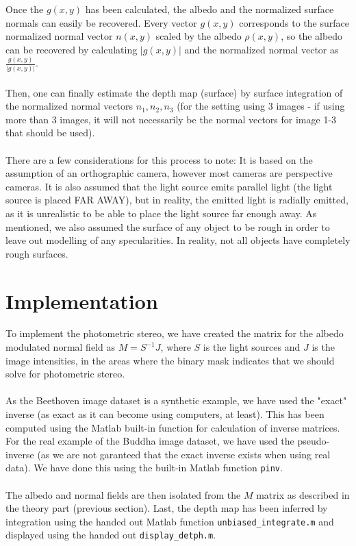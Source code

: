 \documentclass[12pt,a4paper,oneside,final]{article}
\begin{document}
Once the $g(x,y)$ has been calculated, the albedo and the normalized surface normals can easily be recovered. Every vector $g(x,y)$ corresponds to the surface normalized normal vector $n(x,y)$ scaled by the albedo $\rho(x,y)$, so the albedo can be recovered by calculating $|g(x,y)|$ and the normalized normal vector as $\frac{g(x,y)}{|g(x,y)|}$.\\\\
Then, one can finally estimate the depth map (surface) by surface integration of the normalized normal vectors $n_1, n_2, n_3$ (for the setting using 3 images - if using more than 3 images, it will not necessarily be the normal vectors for image 1-3 that should be used).\\\\
There are a few considerations for this process to note: It is based on the assumption of an orthographic camera, however most cameras are perspective cameras. It is also assumed that the light source emits parallel light (the light source is placed FAR AWAY), but in reality, the emitted light is radially emitted, as it is unrealistic to be able to place the light source far enough away. As mentioned, we also assumed the surface of any object to be rough in order to leave out modelling of any specularities. In reality, not all objects have completely rough surfaces.

\section{Implementation}

To implement the photometric stereo, we have created the matrix for the albedo modulated normal field as $M = S^{-1} J$, where $S$ is the light sources and $J$ is the image intensities, in the areas where the binary mask indicates that we should solve for photometric stereo.\\\\
As the Beethoven image dataset is a synthetic example, we have used the "exact" inverse (as exact as it can become using computers, at least). This has been computed using the Matlab built-in function for calculation of inverse matrices. For the real example of the Buddha image dataset, we have used the pseudo-inverse (as we are not garanteed that the exact inverse exists when using real data). We have done this using the built-in Matlab function \texttt{pinv}.\\\\
The albedo and normal fields are then isolated from the $M$ matrix as described in the theory part (previous section).
Last, the depth map has been inferred by integration using the handed out Matlab function \texttt{unbiased\_integrate.m} and displayed using the handed out \texttt{display\_detph.m}.
\end{document}
